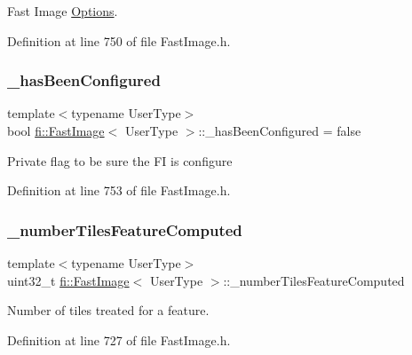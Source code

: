 Fast Image \hyperlink{classfi_1_1FastImage_1_1Options}{Options}. 



Definition at line 750 of file Fast\+Image.\+h.

\mbox{\label{classfi_1_1FastImage_a8229ae7c13d06365af07f6cad94662ba}} 
\subsubsection{\texorpdfstring{\+\_\+has\+Been\+Configured}{\_hasBeenConfigured}}
{\footnotesize\ttfamily template$<$typename User\+Type$>$ \\
bool \hyperlink{classfi_1_1FastImage}{fi\+::\+Fast\+Image}$<$ User\+Type $>$\+::\+\_\+has\+Been\+Configured = false\hspace{0.3cm}{\ttfamily [private]}}

Private flag to be sure the FI is configure 

Definition at line 753 of file Fast\+Image.\+h.

\mbox{\label{classfi_1_1FastImage_a517076aaa824901ca1e14b00a934be54}} 
\subsubsection{\texorpdfstring{\+\_\+number\+Tiles\+Feature\+Computed}{\_numberTilesFeatureComputed}}
{\footnotesize\ttfamily template$<$typename User\+Type$>$ \\
uint32\+\_\+t \hyperlink{classfi_1_1FastImage}{fi\+::\+Fast\+Image}$<$ User\+Type $>$\+::\+\_\+number\+Tiles\+Feature\+Computed\hspace{0.3cm}{\ttfamily [private]}}



Number of tiles treated for a feature. 



Definition at line 727 of file Fast\+Image.\+h.

